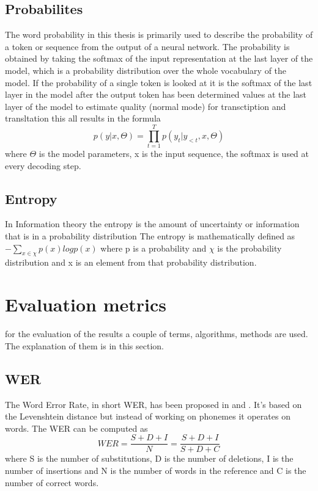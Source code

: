 \subsection{Probabilites}
The word probability in this thesis is primarily used to describe the probability of a token or sequence from the output of a neural network.
The probability is obtained by taking the softmax of the input representation at the last layer of the model, which is a probability distribution over the whole vocabulary of the model. 
If the probability of a single token is looked at it is the softmax of the last layer in the model after the output token has been determined 
values at the last layer of the model to estimate quality (normal mode) for transctiption and transltation 
this all results in the formula $$p(y|x,\Theta)=\prod_{t=1}^T p(y_t|y_{<t}, x, \Theta) $$ where $\Theta$ is the model parameters, x is the input sequence, the softmax is used at every decoding step.

\subsection{Entropy}
\label{entropy}
In Information theory the entropy is the amount of uncertainty or information that is in a probability distribution
The entropy is mathematically defined as $- \sum_{x\in \chi} p(x) log p(x)$ where p is a probability and $\chi$ is the probability distribution and x is an element from that probability distribution.

\section{Evaluation metrics}
 for the evaluation of the results a couple of terms, algorithms, methods are used. The explanation of them is in this section. 
 
\subsection{WER}
\label{wer}
The Word Error Rate, in short WER, has been proposed in \cite{woodard1982} and \cite{morris2004}.
It's based on the Levenshtein distance but instead of working on phonemes it operates on words.
The WER can be computed as $$WER=\frac{S+D+I}{N}=\frac{S+D+I}{S+D+C}$$ where S is the number of substitutions, D is the number of deletions, I is the number of insertions and N is the number of words in the reference and C is the number of correct words.

